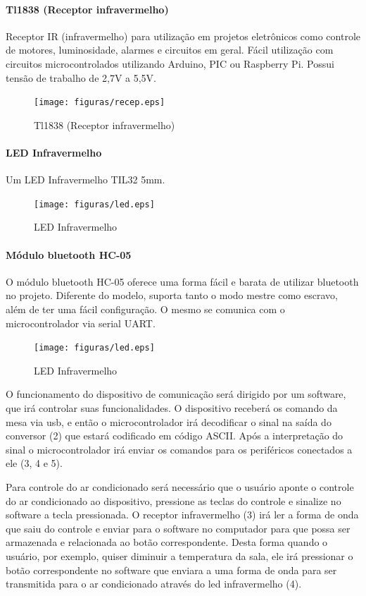 \paragraph{Tl1838 (Receptor infravermelho)}
Receptor IR (infravermelho) para
utilização em projetos eletrônicos como controle de motores, luminosidade,
alarmes e circuitos em geral. Fácil utilização com circuitos microcontrolados
utilizando Arduino, PIC ou Raspberry Pi. Possui tensão de trabalho de 2,7V a
5,5V.

\begin{figure}[!h]
  \centering
  \texttt{[image: figuras/recep.eps]}
  \caption{Tl1838 (Receptor infravermelho)\label{fig:recep}}
\end{figure}

\paragraph{LED Infravermelho}
Um LED Infravermelho TIL32 5mm.

\begin{figure}[!h]
  \centering
  \texttt{[image: figuras/led.eps]}
  \caption{LED Infravermelho\label{fig:led}}
\end{figure}

\paragraph{Módulo bluetooth HC-05}
O módulo bluetooth HC-05 oferece uma forma
fácil e barata de utilizar bluetooth no projeto. Diferente do modelo, suporta
tanto o modo mestre como escravo, além de ter uma fácil configuração. O mesmo se
comunica com o microcontrolador via serial UART.

\begin{figure}[!h]
  \centering
  \texttt{[image: figuras/led.eps]}
  \caption{LED Infravermelho\label{fig:led}}
\end{figure}

O funcionamento do dispositivo de comunicação será dirigido por um software, que
irá controlar suas funcionalidades. O dispositivo receberá os comando da mesa
via usb, e então o microcontrolador irá decodificar o sinal na saída do
conversor (2) que estará codificado em código ASCII. Após a interpretação do
sinal o microcontrolador irá enviar os comandos para os periféricos conectados a
ele (3, 4 e 5).

Para controle do ar condicionado será necessário que o usuário aponte o controle
do ar condicionado ao dispositivo, pressione as teclas do controle e sinalize no
software a tecla pressionada. O receptor infravermelho (3) irá ler a forma de
onda que saiu do controle e enviar para o software no computador para que possa
ser armazenada e relacionada ao botão correspondente. Desta forma quando o
usuário, por exemplo, quiser diminuir a temperatura da sala, ele irá pressionar
o botão correspondente no software que enviara a uma forma de onda para ser
transmitida para o ar condicionado através do led infravermelho (4).

